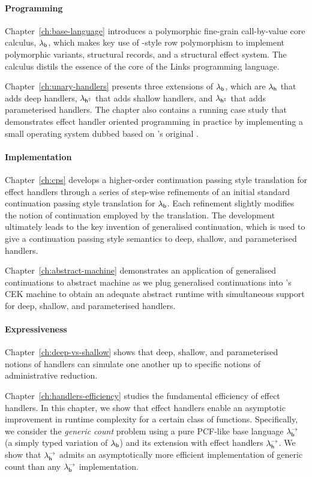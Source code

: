 \documentclass[12pt,phd,lfcs,twoside,openright,logo,leftchapter,normalheadings]{infthesis}
\theoremstyle{plain}
\theoremstyle{definition}
\begin{document}
\paragraph{Programming}
Chapter~\ref{ch:base-language} introduces a polymorphic fine-grain
call-by-value core calculus, $\lambda_{\mathsf{b}}$, which makes key use of
\citeauthor{Remy93}-style row polymorphism to implement polymorphic
variants, structural records, and a structural effect system. The
calculus distils the essence of the core of the Links programming
language.

Chapter~\ref{ch:unary-handlers} presents three extensions of $\lambda_{\mathsf{b}}$,
which are $\lambda_{\mathsf{h}}$ that adds deep handlers, $\lambda_{\mathsf{h^\dagger}}$ that adds shallow
handlers, and $\lambda_{\mathsf{h^{\ddagger}}}$ that adds parameterised handlers. The chapter
also contains a running case study that demonstrates effect handler
oriented programming in practice by implementing a small operating
system dubbed \OSname{} based on \citeauthor{RitchieT74}'s original
\UNIX{}.

\paragraph{Implementation}
Chapter~\ref{ch:cps} develops a higher-order continuation passing
style translation for effect handlers through a series of step-wise
refinements of an initial standard continuation passing style
translation for $\lambda_{\mathsf{b}}$. Each refinement slightly modifies the notion
of continuation employed by the translation. The development
ultimately leads to the key invention of generalised continuation,
which is used to give a continuation passing style semantics to deep,
shallow, and parameterised handlers.

Chapter~\ref{ch:abstract-machine} demonstrates an application of
generalised continuations to abstract machine as we plug generalised
continuations into \citeauthor{FelleisenF86}'s CEK machine to obtain
an adequate abstract runtime with simultaneous support for deep,
shallow, and parameterised handlers.

\paragraph{Expressiveness}
Chapter~\ref{ch:deep-vs-shallow} shows that deep, shallow, and
parameterised notions of handlers can simulate one another up to
specific notions of administrative reduction.

Chapter~\ref{ch:handlers-efficiency} studies the fundamental efficiency of effect
handlers. In this chapter, we show that effect handlers enable an
asymptotic improvement in runtime complexity for a certain class of
functions. Specifically, we consider the \emph{generic count} problem
using a pure PCF-like base language $\lambda^\rightarrow_{\mathsf{b}}$ (a simply typed variation
of $\lambda_{\mathsf{b}}$) and its extension with effect handlers $\lambda^\rightarrow_{\mathsf{h}}$.
%
We show that $\lambda^\rightarrow_{\mathsf{h}}$ admits an asymptotically more efficient
implementation of generic count than any $\lambda^\rightarrow_{\mathsf{b}}$ implementation.
%
\end{document}
